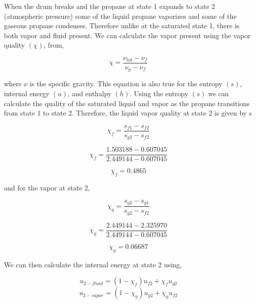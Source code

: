 \documentclass[10pt,parskip=half,
toc=sectionentrywithdots,
bibliography=totocnumbered,
captions=tableheading,numbers=noendperiod]{scrartcl}
\begin{document}
When the drum breaks and the propane at state 1 expands to state 2
(atmospheric pressure) some of the liquid propane vaporizes and some of
the gaseous propane condenses. Therefore unlike at the saturated state
1, there is both vapor and fluid present. We can calculate the vapor
present using the vapor quality \((\chi)\), from,

\begin{equation}\chi = \frac{\nu_{tot} - \nu_f}{\nu_g-\nu_f}\end{equation}

where \(\nu\) is the specific gravity. This equation is also true for
the entropy \((s)\), internal energy \((u)\), and enthalpy \((h)\).
Using the entropy \((s)\) we can calculate the quality of the saturated
liquid and vapor as the propane transitions from state 1 to state 2.
Therefore, the liquid vapor quality at state 2 is given by s

\begin{equation}\chi_f = \frac{s_{f1} - s_{f2}}{s_{g2}-s_{f2}}\end{equation}

\begin{equation}\chi_f = \frac{1.503188 - 0.607045}{2.449144-0.607045}\end{equation}

\begin{equation}\chi_f = 0.4865\end{equation}

and for the vapor at state 2,

\begin{equation}\chi_g = \frac{s_{g2} - s_{g1}}{s_{g2}-s_{f2}}\end{equation}

\begin{equation}\chi_g= \frac{2.449144 - 2.325970}{2.449144-0.607045}\end{equation}

\begin{equation}\chi_g = 0.06687\end{equation}

We can then calculate the internal energy at state 2 using,

\begin{equation}u_{2-fluid} = (1-\chi_f)u_{f2} + \chi_f u_{g2}\end{equation}
\begin{equation}u_{2-vapor} = (1-\chi_g)u_{g2} + \chi_g u_{f2}\end{equation}
\end{document}
